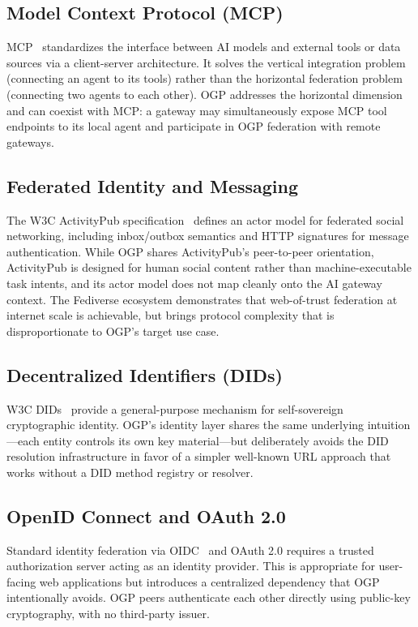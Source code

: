 \documentclass[conference]{IEEEtran}
\begin{document}
\subsection{Model Context Protocol (MCP)}

MCP~\cite{mcp2024} standardizes the interface between AI models and external tools or data sources via a client-server architecture. It solves the vertical integration problem (connecting an agent to its tools) rather than the horizontal federation problem (connecting two agents to each other). OGP addresses the horizontal dimension and can coexist with MCP: a gateway may simultaneously expose MCP tool endpoints to its local agent and participate in OGP federation with remote gateways.

\subsection{Federated Identity and Messaging}

The W3C ActivityPub specification~\cite{activitypub} defines an actor model for federated social networking, including inbox/outbox semantics and HTTP signatures for message authentication. While OGP shares ActivityPub's peer-to-peer orientation, ActivityPub is designed for human social content rather than machine-executable task intents, and its actor model does not map cleanly onto the AI gateway context. The Fediverse ecosystem demonstrates that web-of-trust federation at internet scale is achievable, but brings protocol complexity that is disproportionate to OGP's target use case.

\subsection{Decentralized Identifiers (DIDs)}

W3C DIDs~\cite{did2022} provide a general-purpose mechanism for self-sovereign cryptographic identity. OGP's identity layer shares the same underlying intuition---each entity controls its own key material---but deliberately avoids the DID resolution infrastructure in favor of a simpler well-known URL approach that works without a DID method registry or resolver.

\subsection{OpenID Connect and OAuth 2.0}

Standard identity federation via OIDC~\cite{oidc} and OAuth 2.0 requires a trusted authorization server acting as an identity provider. This is appropriate for user-facing web applications but introduces a centralized dependency that OGP intentionally avoids. OGP peers authenticate each other directly using public-key cryptography, with no third-party issuer.
\end{document}
